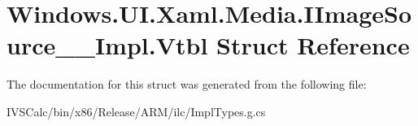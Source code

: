 \hypertarget{struct_windows_1_1_u_i_1_1_xaml_1_1_media_1_1_i_image_source_____impl_1_1_vtbl}{}\section{Windows.\+U\+I.\+Xaml.\+Media.\+I\+Image\+Source\+\_\+\+\_\+\+Impl.\+Vtbl Struct Reference}
\label{struct_windows_1_1_u_i_1_1_xaml_1_1_media_1_1_i_image_source_____impl_1_1_vtbl}


The documentation for this struct was generated from the following file\+:\begin{DoxyCompactItemize}
\item 
I\+V\+S\+Calc/bin/x86/\+Release/\+A\+R\+M/ilc/Impl\+Types.\+g.\+cs\end{DoxyCompactItemize}
